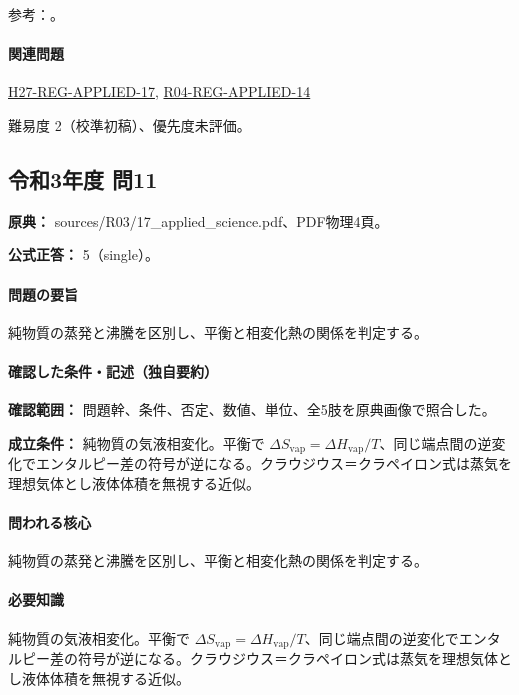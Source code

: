 \par 参考：\cite{mit_solutions2008,mit_clapeyron2008}。

\paragraph{関連問題} \hyperref[q:h27-reg-applied-17]{H27-REG-APPLIED-17}, \hyperref[q:r04-reg-applied-14]{R04-REG-APPLIED-14}

\par 難易度 2（校準初稿）、優先度未評価。

\subsection{令和3年度 問11}
\label{q:r03-reg-applied-11}

\noindent\textbf{原典：} sources/R03/17\_applied\_science.pdf、PDF物理4頁。

\textbf{公式正答：} 5（single）。

\paragraph{問題の要旨} 純物質の蒸発と沸騰を区別し、平衡と相変化熱の関係を判定する。

\paragraph{確認した条件・記述（独自要約）}\mbox{}\par

\noindent\textbf{確認範囲：} 問題幹、条件、否定、数値、単位、全5肢を原典画像で照合した。\par

\noindent\textbf{成立条件：} 純物質の気液相変化。平衡で \(\Delta S_{\mathrm{vap}}=\Delta H_{\mathrm{vap}}/T\)、同じ端点間の逆変化でエンタルピー差の符号が逆になる。クラウジウス＝クラペイロン式は蒸気を理想気体とし液体体積を無視する近似。\par

\paragraph{問われる核心} 純物質の蒸発と沸騰を区別し、平衡と相変化熱の関係を判定する。

\paragraph{必要知識} 純物質の気液相変化。平衡で \(\Delta S_{\mathrm{vap}}=\Delta H_{\mathrm{vap}}/T\)、同じ端点間の逆変化でエンタルピー差の符号が逆になる。クラウジウス＝クラペイロン式は蒸気を理想気体とし液体体積を無視する近似。

